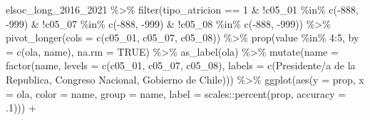 \documentclass[
  12pt,
]{book}
\newenvironment{Shaded}{\begin{snugshade}}{\end{snugshade}}
\newcommand{\AttributeTok}[1]{\textcolor[rgb]{0.77,0.63,0.00}{#1}}
\newcommand{\ConstantTok}[1]{\textcolor[rgb]{0.00,0.00,0.00}{#1}}
\newcommand{\DecValTok}[1]{\textcolor[rgb]{0.00,0.00,0.81}{#1}}
\newcommand{\FunctionTok}[1]{\textcolor[rgb]{0.00,0.00,0.00}{#1}}
\newcommand{\NormalTok}[1]{#1}
\newcommand{\SpecialCharTok}[1]{\textcolor[rgb]{0.00,0.00,0.00}{#1}}
\newcommand{\StringTok}[1]{\textcolor[rgb]{0.31,0.60,0.02}{#1}}
\begin{document}
\begin{Shaded}
\begin{Highlighting}[]
\NormalTok{elsoc\_long\_2016\_2021 }\SpecialCharTok{\%\textgreater{}\%} 
  \FunctionTok{filter}\NormalTok{(tipo\_atricion }\SpecialCharTok{==} \DecValTok{1} \SpecialCharTok{\&} \SpecialCharTok{!}\NormalTok{c05\_01 }\SpecialCharTok{\%in\%} \FunctionTok{c}\NormalTok{(}\SpecialCharTok{{-}}\DecValTok{888}\NormalTok{, }\SpecialCharTok{{-}}\DecValTok{999}\NormalTok{) }\SpecialCharTok{\&} \SpecialCharTok{!}\NormalTok{c05\_07 }\SpecialCharTok{\%in\%} \FunctionTok{c}\NormalTok{(}\SpecialCharTok{{-}}\DecValTok{888}\NormalTok{, }\SpecialCharTok{{-}}\DecValTok{999}\NormalTok{) }\SpecialCharTok{\&} \SpecialCharTok{!}\NormalTok{c05\_08 }\SpecialCharTok{\%in\%} \FunctionTok{c}\NormalTok{(}\SpecialCharTok{{-}}\DecValTok{888}\NormalTok{, }\SpecialCharTok{{-}}\DecValTok{999}\NormalTok{)) }\SpecialCharTok{\%\textgreater{}\%} 
  \FunctionTok{pivot\_longer}\NormalTok{(}\AttributeTok{cols =} \FunctionTok{c}\NormalTok{(c05\_01, c05\_07, c05\_08)) }\SpecialCharTok{\%\textgreater{}\%} 
  \FunctionTok{prop}\NormalTok{(value }\SpecialCharTok{\%in\%} \DecValTok{4}\SpecialCharTok{:}\DecValTok{5}\NormalTok{, }\AttributeTok{by =} \FunctionTok{c}\NormalTok{(ola, name), }\AttributeTok{na.rm =} \ConstantTok{TRUE}\NormalTok{) }\SpecialCharTok{\%\textgreater{}\%} 
  \FunctionTok{as\_label}\NormalTok{(ola) }\SpecialCharTok{\%\textgreater{}\%} 
  \FunctionTok{mutate}\NormalTok{(}\AttributeTok{name =} \FunctionTok{factor}\NormalTok{(name, }
                       \AttributeTok{levels =} \FunctionTok{c}\NormalTok{(}\StringTok{\textquotesingle{}c05\_01\textquotesingle{}}\NormalTok{, }\StringTok{\textquotesingle{}c05\_07\textquotesingle{}}\NormalTok{, }\StringTok{\textquotesingle{}c05\_08\textquotesingle{}}\NormalTok{),}
                       \AttributeTok{labels =} \FunctionTok{c}\NormalTok{(}\StringTok{\textquotesingle{}Presidente/a de la Republica\textquotesingle{}}\NormalTok{, }\StringTok{\textquotesingle{}Congreso Nacional\textquotesingle{}}\NormalTok{, }\StringTok{\textquotesingle{}Gobierno de Chile\textquotesingle{}}\NormalTok{))) }\SpecialCharTok{\%\textgreater{}\%} 
  \FunctionTok{ggplot}\NormalTok{(}\FunctionTok{aes}\NormalTok{(}\AttributeTok{y =}\NormalTok{ prop, }\AttributeTok{x =}\NormalTok{ ola, }\AttributeTok{color =}\NormalTok{ name, }\AttributeTok{group =}\NormalTok{ name,}
               \AttributeTok{label =}\NormalTok{ scales}\SpecialCharTok{::}\FunctionTok{percent}\NormalTok{(prop, }\AttributeTok{accuracy =}\NormalTok{ .}\DecValTok{1}\NormalTok{))) }\SpecialCharTok{+}

\end{Highlighting}
\end{Shaded}
\end{document}
